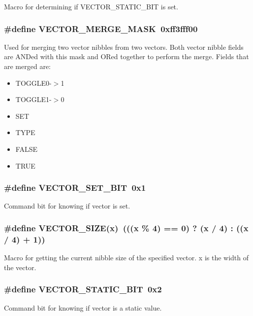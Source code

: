 Macro for determining if VECTOR\_\-STATIC\_\-BIT is set. 
\subsubsection{\setlength{\rightskip}{0pt plus 5cm}\#define VECTOR\_\-MERGE\_\-MASK\ 0xff3fff00}\label{group__vector__defs_a5}


Used for merging two vector nibbles from two vectors. Both vector nibble fields are ANDed with this mask and ORed together to perform the merge. Fields that are merged are:\begin{itemize}
\item TOGGLE0-$>$1\item TOGGLE1-$>$0\item SET\item TYPE\item FALSE\item TRUE \end{itemize}
\subsubsection{\setlength{\rightskip}{0pt plus 5cm}\#define VECTOR\_\-SET\_\-BIT\ 0x1}\label{group__vector__defs_a0}


Command bit for knowing if vector is set. 
\subsubsection{\setlength{\rightskip}{0pt plus 5cm}\#define VECTOR\_\-SIZE(x)\ (((x \% 4) == 0) ? (x / 4) : ((x / 4) + 1))}\label{group__vector__defs_a4}


Macro for getting the current nibble size of the specified vector. x is the width of the vector. 
\subsubsection{\setlength{\rightskip}{0pt plus 5cm}\#define VECTOR\_\-STATIC\_\-BIT\ 0x2}\label{group__vector__defs_a1}


Command bit for knowing if vector is a static value. 
